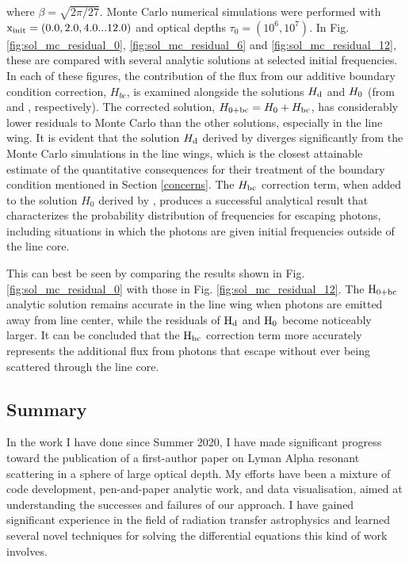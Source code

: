 \documentclass[onecolumn]{aastex63}
\begin{document}
\noindent where $\beta = \sqrt{2 \pi / 27}$. Monte Carlo numerical simulations were performed with $\rm x_{init} = (0.0, 2.0, 4.0 ... 12.0)$ and optical depths $\tau_0 = (10^6, 10^7)$. In Fig. \ref{fig:sol_mc_residual_0}, \ref{fig:sol_mc_residual_6} and \ref{fig:sol_mc_residual_12}, these are compared with several analytic solutions at selected initial frequencies. In each of these figures, the contribution of the flux from our additive boundary condition correction, $H_{bc}$, is examined alongside the solutions $H_{\rm d}$ and $H_{\rm 0}$ (from \cite{harrington1973} and \cite{2006ApJ...649...14D}, respectively). The corrected solution, $H_{\rm 0 + bc} = H_{\rm 0} + H_{\rm bc}$, has considerably lower residuals to Monte Carlo than the other solutions, especially in the line wing. It is evident that the solution $H_{\rm d}$ derived by \citet{harrington1973} diverges significantly from the Monte Carlo simulations in the line wings, which is the closest attainable estimate of the quantitative consequences for their treatment of the boundary condition mentioned in Section \ref{concerns}.  The $H_{\rm bc}$ correction term, when added to the solution $H_0$ derived by \citet{2006ApJ...649...14D}, produces a successful analytical result that characterizes the probability distribution of frequencies for escaping photons, including situations in which the photons are given initial frequencies outside of the line core.

This can best be seen by comparing the results shown in Fig. \ref{fig:sol_mc_residual_0} with those in Fig. \ref{fig:sol_mc_residual_12}. The $\rm H_{0+bc}$ analytic solution remains accurate in the line wing when photons are emitted away from line center, while the residuals of $\rm H_d$ and $\rm H_0$ become noticeably larger. It can be concluded that the $\rm H_{bc}$ correction term more accurately represents the additional flux from photons that escape without ever being scattered through the line core.

\subsection{Summary}

In the work I have done since Summer 2020, I have made significant progress toward the publication of a first-author paper on Lyman Alpha resonant scattering in a sphere of large optical depth. My efforts have been a mixture of code development, pen-and-paper analytic work, and data visualisation, aimed at understanding the successes and failures of our approach. I have gained significant experience in the field of radiation transfer astrophysics and learned several novel techniques for solving the differential equations this kind of work involves. 
\end{document}
